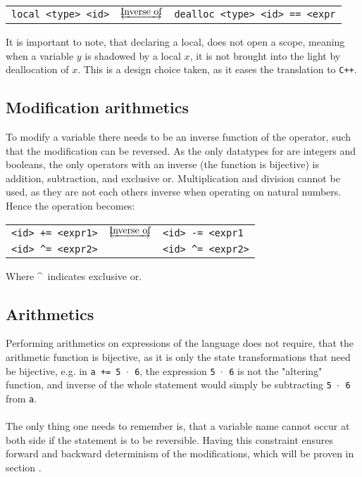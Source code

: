 \begin{table*}[h]
    \centering
    \begin{tabular}{lcl}
        \texttt{local <type> <id>}
        & $\underleftrightarrow{\text{Inverse of}}$ &
        \texttt{dealloc <type> <id> == <expr}
    \end{tabular}
\end{table*}
\noindent
It is important to note, that declaring a local, does not open a scope, meaning when a variable
$y$ is shadowed by a local $x$, it is not brought into the light by deallocation of $x$.
This is a design choice taken, as it eases the translation to \texttt{C++}.

\subsection{Modification arithmetics \rr}
To modify a variable there needs to be an inverse function of the operator, such that the
modification can be reversed. As the only datatypes for \lan are integers and booleans,
the only operators with an inverse (the function is bijective) is addition, subtraction, and
exclusive or. Multiplication and division cannot be used, as they are not each others inverse
when operating on natural numbers. Hence the operation becomes:

\begin{table*}[h]
    \centering
    \begin{tabular}{lcl}
        \texttt{<id> += <expr1>} & $\underleftrightarrow{\text{Inverse of}}$ & \texttt{<id> -= <expr1} \\
        \texttt{<id> \textasciicircum= <expr2>} & & \texttt{<id> \textasciicircum= <expr2>}
    \end{tabular}
\end{table*}
\noindent
Where \textasciicircum ~indicates exclusive or.

\subsection{Arithmetics \rr}
Performing arithmetics on expressions of the language does not require, that the arithmetic function
is bijective, as it is only the state transformations that need be bijective, e.g. in
\texttt{a += 5 $\cdot$ 6}, the expression \texttt{5 $\cdot$ 6} is not the "altering" function, and
inverse of the whole statement would simply be subtracting \texttt{5 $\cdot$ 6} from \texttt{a}.
\\
\\
The only thing one needs to remember is, that a variable name cannot occur at both side if the
statement is to be reversible. Having this constraint ensures forward and backward determinism
of the modifications, which will be proven in section .

